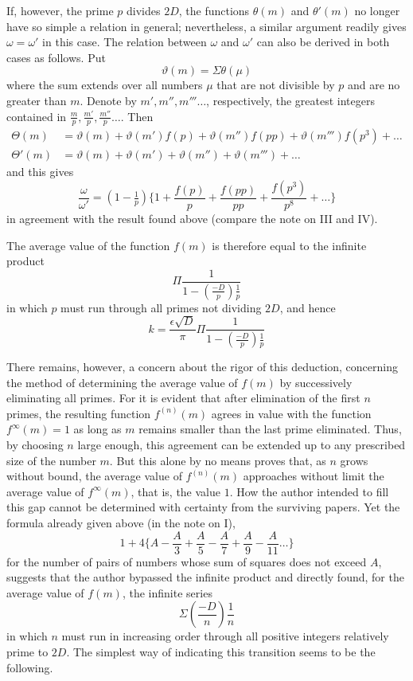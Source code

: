 If, however, the prime $p$ divides $2D$, the functions $\theta(m)$ and $\theta'(m)$ no longer have so simple a relation in general; nevertheless, a similar argument readily gives $\omega=\omega'$ in this case. The relation between $\omega$ and $\omega'$ can also be derived in both cases as follows. Put
\[
\vartheta(m)=\Sigma\theta(\mu)
\]
where the sum extends over all numbers $\mu$ that are not divisible by $p$ and are no greater than $m$. Denote by $m',m'',m'''\ldots$, respectively, the greatest integers contained in $\frac mp,\frac{m'}p,\frac{m''}p\ldots$. Then
\[
\begin{aligned}
\Theta(m)&=\vartheta(m)+\vartheta(m')f(p)+\vartheta(m'')f(pp)+\vartheta(m''')f(p^3)+\ldots\\
\Theta'(m)&=\vartheta(m)+\vartheta(m')+\vartheta(m'')+\vartheta(m''')+\ldots
\end{aligned}
\]
and this gives
\[
\frac\omega{\omega'}=(1-\tfrac1p)\{1+\frac{f(p)}p+\frac{f(pp)}{pp}+\frac{f(p^3)}{p^8}+\ldots\}
\]
in agreement with the result found above (compare the note on III and IV).

The average value of the function $f(m)$ is therefore equal to the infinite product
\[
\Pi\frac1{1-\left(\frac{-D}p\right)\frac1p}
\]
in which $p$ must run through all primes not dividing $2D$, and hence
\[
k=\frac{\epsilon\surd D}\pi\Pi\frac1{1-\left(\frac{-D}p\right)\frac1p}
\]

There remains, however, a concern about the rigor of this deduction, concerning the method of determining the average value of $f(m)$ by successively eliminating all primes. For it is evident that after elimination of the first $n$ primes, the resulting function $f^{(n)}(m)$ agrees in value with the function $f^\infty(m)=1$ as long as $m$ remains smaller than the last prime eliminated. Thus, by choosing $n$ large enough, this agreement can be extended up to any prescribed size of the number $m$. But this alone by no means proves that, as $n$ grows without bound, the average value of $f^{(n)}(m)$ approaches without limit the average value of $f^\infty(m)$, that is, the value $1$. How the author intended to fill this gap cannot be determined with certainty from the surviving papers. Yet the formula already given above (in the note on I),
\[
1+4\{A-\frac A3+\frac A5-\frac A7+\frac A9-\frac A{11}\ldots\}
\]
for the number of pairs of numbers whose sum of squares does not exceed $A$, suggests that the author bypassed the infinite product and directly found, for the average value of $f(m)$, the infinite series
\[
\Sigma\left(\frac{-D}n\right)\frac1n
\]
in which $n$ must run in increasing order through all positive integers relatively prime to $2D$. The simplest way of indicating this transition seems to be the following.

